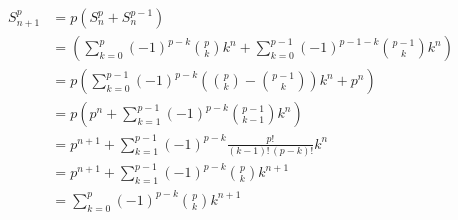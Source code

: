 \begin{enumerate}
\begin{itemize}
				\begin{align*}
					S_{n+1}^p &= p\left( S_n^p + S_n^{p-1} \right)\\
					&= \left(\sum_{k=0}^p (-1)^{p-k} {p\choose k} k^n + \sum_{k=0}^{p-1}(-1)^{p-1-k}{p-1\choose k} k^n\right)\\
					&= p\left( \sum_{k=0}^{p-1}(-1)^{p-k} \left( {p\choose k} - {p-1\choose k} \right) k^n + p^n \right) \\
					&= p \left( p^n + \sum_{k=1}^{p-1} (-1)^{p-k} {p-1\choose k-1} k^n \right) \\
					&= p^{n+1} + \sum_{k=1}^{p-1}(-1)^{p-k} \frac{p!}{(k-1)!\,(p-k)!} k^n \\
					&= p^{n+1} + \sum_{k=1}^{p-1} (-1)^{p-k} {p \choose k} k^{n+1} \\
					&=\sum_{k=0}^p (-1)^{p-k} {p\choose k} k^{n+1}
				\end{align*}
		\end{itemize}
\end{enumerate}
